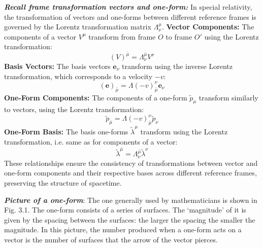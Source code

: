 \documentclass[12pt]{book}
\begin{document}
    \textbf{\textit{Recall frame transformation vectors and one-form:}} In special relativity, the transformation of vectors and one-forms between different reference frames is governed by the Lorentz transformation matrix \(\Lambda^\mu_\nu\).
    \textbf{Vector Components:}
    The components of a vector \(V^\mu\) transform from frame \(O\) to frame \(O'\) using the Lorentz transformation:
    \[
    (V)^{\bar{\mu}} = \Lambda^{\bar{\mu}}_\nu V^\nu
    \]
    \textbf{Basis Vectors:}
    The basis vectors \(\mathbf{e}_\nu\) transform using the inverse Lorentz transformation, which corresponds to a velocity \(-v\):
    \[
    (\mathbf{e})_{\bar{\mu}} = \Lambda(-v)^{\nu}_{\bar{\mu}} \mathbf{e}_\nu
    \]
    \textbf{One-Form Components:}
    The components of a one-form \(\tilde{p}_\mu\) transform similarly to vectors, using the Lorentz transformation:
    \[
    \tilde{p}_{\bar{\mu} }= \Lambda(-v)_{\bar{\mu}}^{\nu} \tilde{p}_\nu
    \]
    \textbf{One-Form Basis:}
    The basis one-forms \(\tilde{\lambda}^\mu\) transform using the Lorentz transformation, i.e. same as for components of a vector:
    \[
    \tilde{\lambda}^{\bar{\mu} }= \Lambda^{\bar{\mu}}_\nu \tilde{\lambda}^\nu
    \]
    These relationships ensure the consistency of transformations between vector and one-form components and their respective bases across different reference frames, preserving the structure of spacetime.
    
    \textit{\textbf{Picture of a one-form}}: The one generally used by mathematicians is shown in Fig. 3.1. The one-form consists of a series of surfaces. The ‘magnitude’ of it is given by the spacing between the surfaces: the larger the spacing the smaller the magnitude. In this picture, the number produced when a one-form acts on a vector is the number of surfaces that the arrow of the vector pierces.
\end{document}
